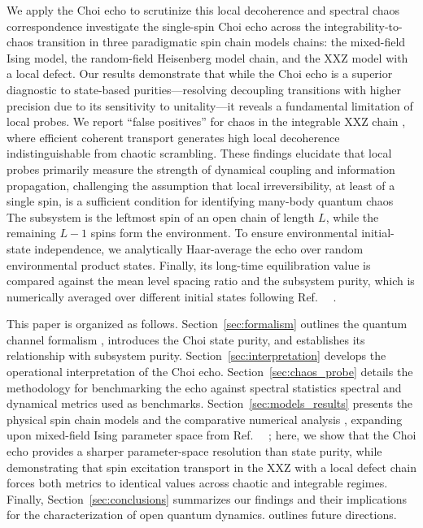 \documentclass[pra,twocolumn,aps,showpacs,superscriptaddress,longbibliography]{revtex4-2}%
\providecommand{\DIFadd}[1]{{\protect\color{blue} \sf #1}} %
\providecommand{\DIFdel}[1]{{\protect\color{red} \scriptsize #1}} %
\providecommand{\DIFaddbegin}{} %
\providecommand{\DIFaddend}{} %
\providecommand{\DIFdelbegin}{} %
\providecommand{\DIFdelend}{} %
\begin{document}
We \DIFdelbegin \DIFdel{apply the Choi echo to scrutinize this local decoherence and spectral chaos correspondence }\DIFdelend \DIFaddbegin \DIFadd{investigate the single-spin Choi echo across the integrability-to-chaos transition }\DIFaddend in three paradigmatic \DIFdelbegin \DIFdel{spin chain models}\DIFdelend \DIFaddbegin \DIFadd{chains}\DIFaddend : the mixed-field Ising model, the random-field Heisenberg \DIFdelbegin \DIFdel{model}\DIFdelend \DIFaddbegin \DIFadd{chain}\DIFaddend , and the XXZ model with a local defect. \DIFdelbegin \DIFdel{Our results demonstrate that while the Choi echo is a superior diagnostic to state-based purities—resolving decoupling transitions with higher precision due to its sensitivity to unitality—it reveals a fundamental limitation of local probes. We report ``false positives'' for chaos in the integrable XXZ chain , where efficient coherent transport generates high local decoherence indistinguishable from chaotic scrambling. These findings elucidate that local probes primarily measure the strength of dynamical coupling and information propagation, challenging the assumption that local irreversibility, at least of a single spin, is a sufficient condition for identifying many-body quantum chaos}\DIFdelend \DIFaddbegin \DIFadd{The subsystem is the leftmost spin of an open chain of length $L$, while the remaining $L-1$ spins form the environment. To ensure environmental initial-state independence, we analytically Haar-average the echo over random environmental product states. Finally, its long-time equilibration value is compared against the mean level spacing ratio and the subsystem purity, which is numerically averaged over different initial states following Ref.~\mbox{%
\cite{mirkin_2021_quantum}}\hskip0pt%
}\DIFaddend .

This paper is organized as follows. Section~\ref{sec:formalism} outlines the quantum channel formalism\DIFaddbegin \DIFadd{, introduces the Choi state purity, and establishes its relationship with subsystem purity}\DIFaddend . Section~\ref{sec:interpretation} develops the operational interpretation of the Choi echo. Section~\ref{sec:chaos_probe} details the \DIFdelbegin \DIFdel{methodology for benchmarking the echo against spectral statistics}\DIFdelend \DIFaddbegin \DIFadd{spectral and dynamical metrics used as benchmarks}\DIFaddend . Section~\ref{sec:models_results} presents the \DIFdelbegin \DIFdel{physical }\DIFdelend \DIFaddbegin \DIFadd{spin chain }\DIFaddend models and the comparative numerical analysis\DIFaddbegin \DIFadd{, expanding upon mixed-field Ising parameter space from Ref.~\mbox{%
\cite{mirkin_2021_quantum}}\hskip0pt%
; here, we show that the Choi echo provides a sharper parameter-space resolution than state purity, while demonstrating that spin excitation transport in the XXZ with a local defect chain forces both metrics to identical values across chaotic and integrable regimes}\DIFaddend . Finally, Section~\ref{sec:conclusions} summarizes our findings and \DIFdelbegin \DIFdel{their implications for the characterization of open quantum dynamics.
}\DIFdelend \DIFaddbegin \DIFadd{outlines future directions.
}
\end{document}
